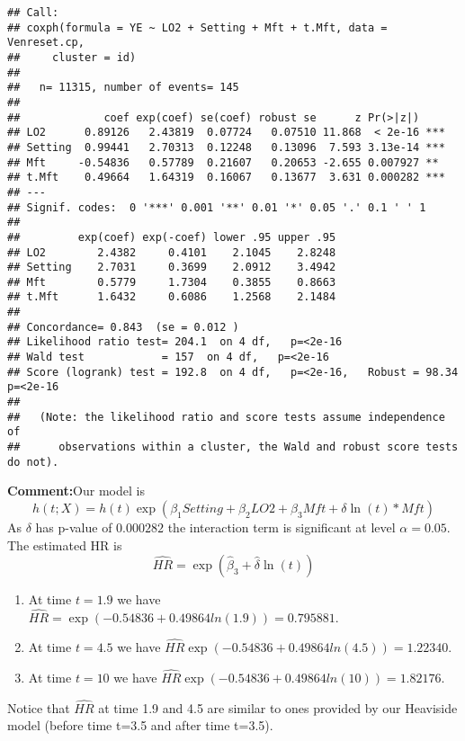 \documentclass[
]{article}
\begin{document}
\begin{verbatim}
## Call:
## coxph(formula = YE ~ LO2 + Setting + Mft + t.Mft, data = Venreset.cp, 
##     cluster = id)
## 
##   n= 11315, number of events= 145 
## 
##             coef exp(coef) se(coef) robust se      z Pr(>|z|)    
## LO2      0.89126   2.43819  0.07724   0.07510 11.868  < 2e-16 ***
## Setting  0.99441   2.70313  0.12248   0.13096  7.593 3.13e-14 ***
## Mft     -0.54836   0.57789  0.21607   0.20653 -2.655 0.007927 ** 
## t.Mft    0.49664   1.64319  0.16067   0.13677  3.631 0.000282 ***
## ---
## Signif. codes:  0 '***' 0.001 '**' 0.01 '*' 0.05 '.' 0.1 ' ' 1
## 
##         exp(coef) exp(-coef) lower .95 upper .95
## LO2        2.4382     0.4101    2.1045    2.8248
## Setting    2.7031     0.3699    2.0912    3.4942
## Mft        0.5779     1.7304    0.3855    0.8663
## t.Mft      1.6432     0.6086    1.2568    2.1484
## 
## Concordance= 0.843  (se = 0.012 )
## Likelihood ratio test= 204.1  on 4 df,   p=<2e-16
## Wald test            = 157  on 4 df,   p=<2e-16
## Score (logrank) test = 192.8  on 4 df,   p=<2e-16,   Robust = 98.34  p=<2e-16
## 
##   (Note: the likelihood ratio and score tests assume independence of
##      observations within a cluster, the Wald and robust score tests do not).
\end{verbatim}

\textbf{Comment:}Our model is \[
h(t;X)=h(t)\exp(\beta_1 Setting + \beta_2 LO2 + \beta_3 Mft + \delta \ln(t)*Mft )
\] As \(\delta\) has p-value of \(0.000282\) the interaction term is
significant at level \(\alpha=0.05\). The estimated HR is \[
\hat{HR}=\exp(\hat{\beta}_3 + \hat{\delta} \ln(t))
\]

\begin{enumerate}
\item[] At time $t=1.9$ we have $\hat{HR}=\exp(-0.54836 +0.49864ln(1.9))=0.795881.$
\item[] At time $t=4.5$ we have $\hat{HR}\exp(-0.54836 +0.49864ln(4.5))=1.22340.$
\item[] At time $t=10$ we have $\hat{HR}\exp(-0.54836 +0.49864ln(10))=1.82176.$
\end{enumerate}

Notice that \(\hat{HR}\) at time 1.9 and 4.5 are similar to ones
provided by our Heaviside model (before time t=3.5 and after time
t=3.5).
\end{document}
